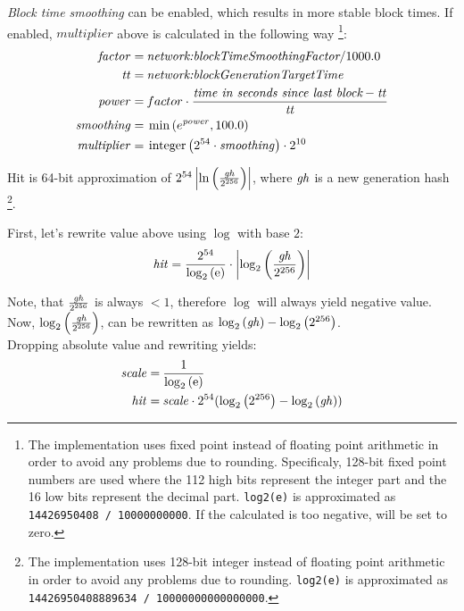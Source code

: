\emph{Block time smoothing} can be enabled, which results in more stable block times.
If enabled, $multiplier$ above is calculated in the following way
\footnote{
	The implementation uses fixed point instead of floating point arithmetic in order to avoid any problems due to rounding.
	Specificaly, 128-bit fixed point numbers are used where the 112 high bits represent the integer part and the 16 low bits represent the decimal part.
	\texttt{log2(e)} is approximated as \texttt{14426950408 / 10000000000}.
	If the calculated  is too negative,  will be set to zero.
}:
\begin{align*}
\mathvar{factor} = \: & \nemsetting{network}{blockTimeSmoothingFactor} / 1000.0 \\
\mathvar{tt} = \: & \nemsetting{network}{blockGenerationTargetTime} \\
\mathvar{power} = \: & factor \cdot \frac{\mathname{time in seconds since last block} - \mathvar{tt}}{\mathvar{tt}} \\
\mathvar{smoothing} = \: & \min\left(e^{\mathvar{power}}, 100.0\right) \\
\mathvar{multiplier} = \: & \mathfunc{integer}\left(2^{54} \cdot \mathvar{smoothing}\right) \cdot 2^{10}
\end{align*}

Hit is 64-bit approximation of $2^{54} \left|\ln\left(\frac{\mathit{gh}}{2^{256}}\right)\right|$, where $\mathit{gh}$ is a new generation hash
\footnote{
	The implementation uses 128-bit integer instead of floating point arithmetic in order to avoid any problems due to rounding.
	\texttt{log2(e)} is approximated as \texttt{14426950408889634 / 10000000000000000}.
}.

First, let's rewrite value above using $\log$ with base $2$:
$$
\mathit{hit} = \frac{2^{54}}{\log_2\left(\mathrm{e}\right)} \cdot \left|\log_2\left(\frac{\mathit{gh}}{2^{256}}\right)\right|
$$

Note, that $\frac{\mathit{gh}}{2^{256}}$ is always $< 1$, therefore $\log$ will always yield negative value. \\
Now, $\log_2\left(\frac{\mathit{gh}}{2^{256}}\right)$, can be rewritten as $\log_2\left(\mathit{gh}\right) - \log_2\left(2^{256}\right)$. \\

Dropping absolute value and rewriting yields:
\begin{align*}
	\mathit{scale} = \: & \frac{1}{\log_2\left(\mathrm{e}\right)} \\
	\mathit{hit} = \: & \mathit{scale} \cdot 2^{54} (\log_2\left(2^{256}\right) - \log_2\left(\mathit{gh}\right))
\end{align*}

